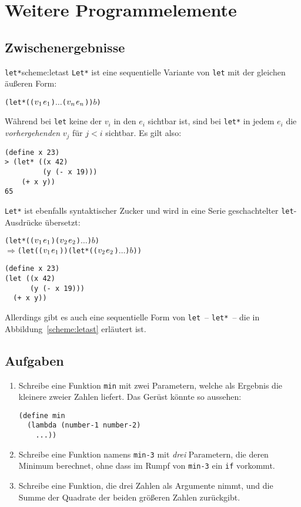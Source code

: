\chapter{Weitere Programmelemente}
\label{cha:elements}

\section{Zwischenergebnisse}

\begin{feature}{\texttt{let*}}{scheme:letast}
\texttt{Let*} ist eine sequentielle
Variante von \texttt{let} mit der gleichen äußeren Form:
%
\begin{alltt}
(let* ((\(v\sb{1}\) \(e\sb{1}\)) \(\ldots\) (\(v\sb{n}\) \(e\sb{n}\))) \(b\))
\end{alltt}
%
Während bei \texttt{let} keine der $v_i$ in den $e_i$ sichtbar ist,
sind bei \texttt{let*} in jedem $e_i$ die \emph{vorhergehenden} $v_j$
für $j<i$ sichtbar.  Es gilt also:
%
\begin{verbatim}
(define x 23)
> (let* ((x 42)
         (y (- x 19)))
    (+ x y))
65
\end{verbatim}
%
\texttt{Let*} ist ebenfalls syntaktischer Zucker und wird in eine
Serie geschachtelter \texttt{let}-Ausdrücke übersetzt:
%
\begin{alltt}
(let* ((\(v\sb{1}\) \(e\sb{1}\)) (\(v\sb{2}\) \(e\sb{2}\)) \(\ldots\)) \(b\))
\(\Longrightarrow\) (let ((\(v\sb{1}\) \(e\sb{1}\))) (let* ((\(v\sb{2}\) \(e\sb{2}\)) \(\ldots\)) \(b\)))
\end{alltt}
\end{feature}
%
\begin{verbatim}
(define x 23)
(let ((x 42)
      (y (- x 19)))
  (+ x y))
\end{verbatim}
%
Allerdings gibt es auch eine sequentielle Form von \texttt{let}~--
\texttt{let*}~-- die in Abbildung~\ref{scheme:letast} erläutert ist.
\section*{Aufgaben}

\begin{aufgabe}
\begin{enumerate}\item
  Schreibe eine Funktion \texttt{min} mit zwei Parametern, welche als
  Ergebnis die kleinere zweier Zahlen liefert.  Das Gerüst könnte so
  aussehen:
\begin{verbatim}
(define min
  (lambda (number-1 number-2)
    ...))
\end{verbatim}
\item Schreibe eine Funktion namens \texttt{min-3} mit \emph{drei}
  Parametern, die deren Minimum berechnet, ohne dass im Rumpf von
  \texttt{min-3} ein \texttt{if} vorkommt.
\item
  Schreibe eine Funktion, die drei Zahlen als Argumente nimmt, und die
  Summe der Quadrate der beiden größeren Zahlen zurückgibt.
\end{enumerate}
\end{aufgabe}

